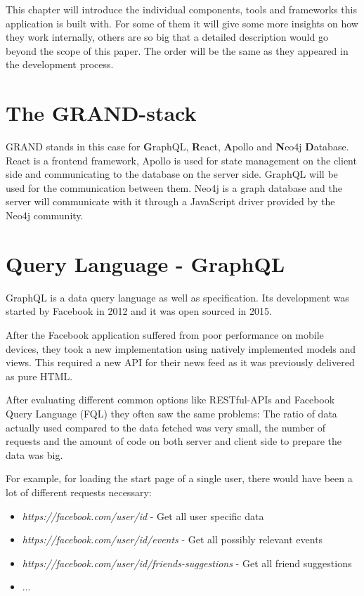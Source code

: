 This chapter will introduce the individual components, tools and frameworks this application is built with. For some of them it will give some more insights on how they work internally, others are so big that a detailed description would go beyond the scope of this paper. The order will be the same as they appeared in the development process.

\section{The GRAND-stack}
GRAND stands in this case for \textbf{G}raphQL, \textbf{R}eact, \textbf{A}pollo and \textbf{N}eo4j \textbf{D}atabase. \cite{GrandStackGettingStarted} React is a frontend framework, Apollo is used for state management on the client side and communicating to the database on the server side. GraphQL will be used for the communication between them. Neo4j is a graph database and the server will communicate with it through a JavaScript driver provided by the Neo4j community.

\section{Query Language - GraphQL}
GraphQL is a data query language as well as specification. Its development was started by Facebook in 2012 and it was open sourced in 2015. \cite{GraphQLFoundation}

After the Facebook application suffered from poor performance on mobile devices, they took a new implementation using natively implemented models and views. This required a new API for their news feed as it was previously delivered as pure HTML. \cite{EngineeringFB}

After evaluating different common options like RESTful-APIs and Facebook Query Language (FQL) they often saw the same problems:  The ratio of data actually used compared to the data fetched was very small, the number of requests \cite{GraphQLIntro} and the amount of code on both server and client side to prepare the data was big. \cite{EngineeringFB}

For example, for loading the start page of a single user, there would have been a lot of different requests necessary:
\begin{itemize}
\item \emph{https://facebook.com/user/id} - Get all user specific data
\item \emph{https://facebook.com/user/id/events} - Get all possibly relevant events
\item \emph{https://facebook.com/user/id/friends-suggestions} - Get all friend suggestions
\item ...
\end{itemize} \cite{GraphQLIntro}

